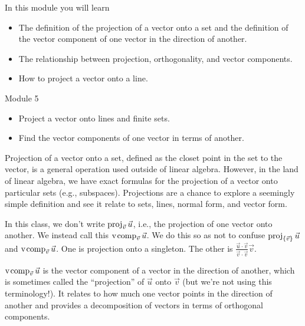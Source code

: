 \documentclass{workbook}
\begin{document}
\begin{module}

	In this module you will learn
	\begin{itemize}
		\item The definition of the projection of a vector onto a set and the definition of the vector component of one vector
			in the direction of another.
		\item The relationship between projection, orthogonality, and vector components.
		\item How to project a vector onto a line.
	\end{itemize}

	
	

\end{module}
\begin{lesson}

	Module 5

	\begin{itemize}
		\item Project a vector onto lines and finite sets.
		\item Find the vector components of one vector in terms of another.
	\end{itemize}

	Projection of a vector onto a set, defined as the closet point in the
	set to the vector, is a general operation used outside of linear algebra.
	However, in the land of linear algebra, we have exact formulas for the
	projection of a vector onto particular sets (e.g., subspaces).
	Projections are a chance to explore a seemingly simple definition
	and see it relate to sets, lines, normal form, and vector form.

	\begin{annotation}
		\begin{notes}
			In this class, we don't write $\operatorname{proj}_{\vec v}\vec u$,
			i.e., the projection of one vector onto another. We
			instead call this $\operatorname{\operatorname{v\hspace{1pt}comp}}_{\vec v}\vec u$. We do this so
			as not to confuse $\operatorname{proj}_{\{\vec v\}}\vec u$ and
			$\operatorname{\operatorname{v\hspace{1pt}comp}}_{\vec v}\vec u$. One is projection onto a singleton.
			The other is $\frac{\vec u\cdot \vec v}{\vec v\cdot \vec v}\vec v$.
		\end{notes}
	\end{annotation}
	$\operatorname{\operatorname{v\hspace{1pt}comp}}_{\vec v}\vec u$ is the vector component of a vector in the direction of another,
	which is sometimes called the ``projection'' of $\vec u$ onto $\vec v$ (but we're not using
	this terminology!). It relates
	to how much one vector points in the direction of another and
	provides a decomposition of vectors in terms of orthogonal components.


\end{lesson}
\end{document}
